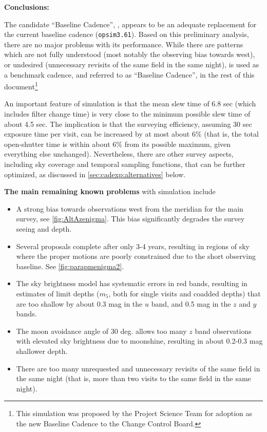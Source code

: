 \vskip 0.2in
{\bf Conclusions:}

The candidate “Baseline Cadence”, , appears to
be an adequate replacement for the current baseline cadence
(\texttt{opsim3.61}). Based on this preliminary analysis, there are no
major problems with its performance. While there are patterns which
are not fully understood (most notably the observing bias towards
west),  or undesired (unnecessary revisits of the same field in the
same night),  is used as a benchmark cadence,
and referred to as ``Baseline Cadence'',  in the rest of this
document\footnote{This simulation was proposed by the Project Science Team
for adoption as the new Baseline Cadence to the Change Control Board.}

An important feature of  simulation is that
the mean slew time of 6.8 sec (which includes filter change time) is
very close to the minimum possible slew time of about 4.5 sec. The
implication is that the surveying efficiency, assuming 30 sec exposure
time per visit, can be increased by at most about 6\% (that is, the
total open-shutter time is within about 6\% from its possible maximum,
given everything else unchanged).  Nevertheless, there are other
survey aspects, including sky coverage and temporal sampling
functions, that can be further optimized, as discussed in
\autoref{sec:cadexp:alternatives} below.

{\bf The main remaining known problems} with  simulation include
\begin{itemize}
\item A strong bias towards observations west from the meridian for
  the main survey, see \autoref{fig:AltAzenigma}.  This bias
  significantly degrades the survey seeing and depth.
\item Several proposals complete after only 3-4 years, resulting in
  regions of sky where the proper motions are poorly constrained due
  to the short observing baseline.  See \autoref{fig:parapmenigma2}.
\item The sky brightness model has systematic errors in red bands,
  resulting in estimates of limit depths ($m_5$, both for single
  visits and coadded depths) that are too shallow by about 0.3 mag in
  the $u$ band, and 0.5 mag in the $z$ and $y$ bands.
\item The moon avoidance angle of 30 deg. allows too many $z$ band
  observations with elevated sky brightness due to moonshine,
  resulting in about 0.2-0.3 mag shallower depth.
\item There are too many unrequested and unnecessary revisits of the
  same field in the same night (that is, more than two visits to the
  same field in the same night).
\end{itemize}

